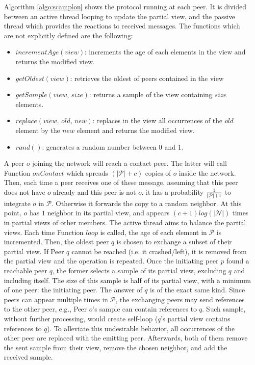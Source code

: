 \begin{asparadesc}
\item [Algorithm]\ref{algo:scamplon} shows the \SCAMPLON{} protocol running at
  each peer. It is divided between an active thread looping to update the
  partial view, and the passive thread which provides the reactions to received
  messages. The functions which are not explicitly defined are the following:
  \begin{itemize}
  \item $incrementAge(view)$: increments the age of each elements in the view
    and returns the modified view.
  \item $getOldest(view)$: retrieves the oldest of peers contained in the view
  \item $getSample(view, \, size)$: returns a sample of the view containing
    $size$ elements.
  \item $replace(view,\,old,\,new)$: replaces in the view all occurrences of
    the $old$ element by the $new$ element and returns the modified view.
  \item $rand()$: generates a random number between 0 and 1.
  \end{itemize}
  A peer $o$ joining the network will reach a contact peer. The latter will
  call Function $onContact$ which spreads $(|\mathcal{P}|+c)$ copies of $o$
  inside the network. Then, each time a peer receives one of these message,
  assuming that this peer does not have $o$ already and this peer is not $o$,
  it has a probability $1\over{|\mathcal{P}|+1}$ to integrate $o$ in
  $\mathcal{P}$. Otherwise it forwards the copy to a random neighbor.  At this
  point, $o$ has $1$ neighbor in its partial view, and appears
  $(c+1)log(|\mathcal{N}|)$ times in partial views of other members. The active
  thread aims to balance the partial views. Each time Function $loop$ is
  called, the age of each element in $\mathcal{P}$ is incremented. Then, the
  oldest peer $q$ is chosen to exchange a subset of their partial view. If Peer
  $q$ cannot be reached (i.e. it crashed/left), it is removed from the partial
  view and the operation is repeated. Once the initiating peer $p$ found a
  reachable peer $q$, the former selects a sample of its partial view,
  excluding $q$ and including itself. The size of this sample is half of its
  partial view, with a minimum of one peer: the initiating peer. The answer of
  $q$ is of the exact same kind. Since peers can appear multiple times in
  $\mathcal{P}$, the exchanging peers may send references to the other peer,
  e.g., Peer $o$'s sample can contain references to $q$. Such sample, without
  further processing, would create self-loop ($q$'s partial view contains
  references to $q$). To alleviate this undesirable behavior, all occurrences
  of the other peer are replaced with the emitting peer.  Afterwards, both of
  them remove the sent sample from their view, remove the chosen neighbor, and
  add the received sample.
\end{asparadesc}

